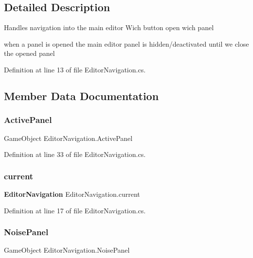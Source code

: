 \subsection{Detailed Description}
Handles navigation into the main editor Wich button open wich panel 

when a panel is opened the main editor panel is hidden/deactivated until we close the opened panel 

Definition at line 13 of file Editor\+Navigation.\+cs.



\subsection{Member Data Documentation}
\mbox{\label{class_editor_navigation_afaf84b95d6709ce11866f5b20c5f9de0}} 
\subsubsection{Active\+Panel}
{\footnotesize\ttfamily Game\+Object Editor\+Navigation.\+Active\+Panel}



Definition at line 33 of file Editor\+Navigation.\+cs.

\mbox{\label{class_editor_navigation_ae206556547bcaa5579167d3c9b9a226e}} 
\subsubsection{current}
{\footnotesize\ttfamily \textbf{ Editor\+Navigation} Editor\+Navigation.\+current\hspace{0.3cm}{\ttfamily [static]}}



Definition at line 17 of file Editor\+Navigation.\+cs.

\mbox{\label{class_editor_navigation_a32e26cebe4048fe4f121a026effda20f}} 
\subsubsection{Noise\+Panel}
{\footnotesize\ttfamily Game\+Object Editor\+Navigation.\+Noise\+Panel}



